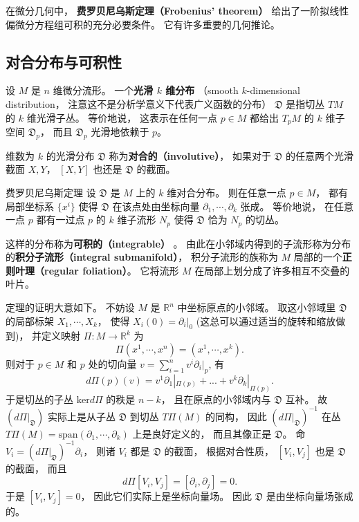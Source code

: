 

在微分几何中， \textbf{费罗贝尼乌斯定理（Frobenius' theorem）} 给出了一阶拟线性偏微分方程组可积的充分必要条件。 它有许多重要的几何推论。

\subsection{对合分布与可积性}
设 $M$ 是 $n$ 维微分流形。 一个\textbf{光滑 $k$ 维分布} （smooth $k$-dimensional distribution， 注意这不是分析学意义下代表广义函数的分布） $\mathfrak{D}$ 是指切丛 $TM$ 的 $k$ 维光滑子丛。 等价地说， 这表示在任何一点 $p\in M$ 都给出 $T_pM$ 的 $k$ 维子空间 $\mathfrak{D}_p$， 而且 $\mathfrak{D}_p$ 光滑地依赖于 $p$。

维数为 $k$ 的光滑分布 $\mathfrak{D}$ 称为\textbf{对合的（involutive）}， 如果对于 $\mathfrak{D}$ 的任意两个光滑截面 $X,Y$， $[X,Y]$ 也还是 $\mathfrak{D}$ 的截面。 

\begin{theorem}{费罗贝尼乌斯定理}
设 $\mathfrak{D}$ 是 $M$ 上的 $k$ 维对合分布。 则在任意一点 $p\in M$， 都有局部坐标系 $\{x^i\}$ 使得 $\mathfrak{D}$ 在该点处由坐标向量 $\partial_1,\cdots ,\partial_k$ 张成。 等价地说， 在任意一点 $p$ 都有一过点 $p$ 的 $k$ 维子流形 $N_p$ 使得 $\mathfrak{D}$ 恰为 $N_p$ 的切丛。
\end{theorem}
这样的分布称为\textbf{可积的（integrable）} 。 由此在小邻域内得到的子流形称为分布的\textbf{积分子流形（integral submanifold）}， 积分子流形的族称为 $M$ 局部的一个\textbf{正则叶理（regular foliation）}。 它将流形 $M$ 在局部上划分成了许多相互不交叠的叶片。

定理的证明大意如下。 不妨设 $M$ 是 $\mathbb{R}^n$ 中坐标原点的小邻域。 取这小邻域里 $\mathfrak{D}$ 的局部标架 $X_1,\cdots ,X_k$， 使得 $X_i(0)=\partial_i|_0$ (这总可以通过适当的旋转和缩放做到)， 并定义映射 $\Pi: M\to \mathbb{R}^k$ 为
$$
\Pi(x^1,\cdots ,x^n)=(x^1,\cdots ,x^k).
$$
则对于 $p\in M$ 和 $p$ 处的切向量 $v=\sum_{i=1}^nv^i\partial_i|_p$, 有
$$
d\Pi(p)(v)=v^1\partial_1|_{\Pi(p)}+...+v^k\partial_k|_{\Pi(p)}.
$$
于是切丛的子丛 $\text{ker}d\Pi$ 的秩是 $n-k$， 且在原点的小邻域内与 $\mathfrak{D}$ 互补。 故 $(d\Pi|_{\mathfrak{D}})$ 实际上是从子丛 $\mathfrak{D}$ 到切丛 $T\Pi(M)$ 的同构， 因此 $(d\Pi|_{\mathfrak{D}})^{-1}$ 在丛 $T\Pi(M)=\text{span}(\partial_1,\cdots ,\partial_k)$ 上是良好定义的， 而且其像正是 $\mathfrak{D}$。 命 $V_i=(d\Pi|_{\mathfrak{D}})^{-1}\partial_i$， 则诸 $V_i$ 都是 $\mathfrak{D}$ 的截面， 根据对合性质， $[V_i,V_j]$ 也是 $\mathfrak{D}$ 的截面， 而且
$$
d\Pi[V_i,V_j]=[\partial_i,\partial_j]=0.
$$
于是 $[V_i,V_j]=0$， 因此它们实际上是坐标向量场。 因此 $\mathfrak{D}$ 是由坐标向量场张成的。

